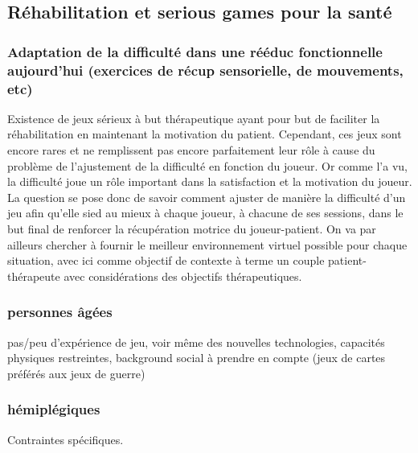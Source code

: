 \subsection{Réhabilitation et serious games pour la santé}

		\subsubsection{Adaptation de la difficulté dans une rééduc fonctionnelle aujourd'hui (exercices de récup sensorielle, de mouvements, etc)}
Existence de jeux sérieux à but thérapeutique ayant pour but de faciliter la réhabilitation en maintenant la motivation du patient. Cependant, ces jeux sont encore rares et ne remplissent pas encore parfaitement leur rôle à cause du problème de l'ajustement de la difficulté en fonction du joueur.
Or comme l'a vu, la difficulté joue un rôle important dans la satisfaction et la motivation du joueur. La question se pose donc de savoir comment ajuster de manière la difficulté d'un jeu afin qu'elle sied au mieux à chaque joueur, à chacune de ses sessions, dans le but final de renforcer la récupération motrice du joueur-patient. On va par ailleurs chercher à fournir le meilleur environnement virtuel possible pour chaque situation, avec ici comme objectif de contexte à terme un couple patient-thérapeute avec considérations des objectifs thérapeutiques. 
		
		\subsubsection{personnes âgées\\}
pas/peu d'expérience de jeu, voir même des nouvelles technologies, capacités physiques restreintes, background social à prendre en compte (jeux de cartes préférés aux jeux de guerre)
		\subsubsection{hémiplégiques\\}		
Contraintes spécifiques.